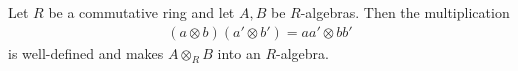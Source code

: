 \documentclass{memoir}
\begin{document}
\begin{prop}
	Let \(R\) be a commutative ring and let \(A,B\) be \(R\)-algebras. Then the multiplication
	\begin{align*}
		(a \otimes b) (a' \otimes b') = a a' \otimes b b'
	\end{align*} is well-defined and makes \(A\otimes_R B\) into an \(R\)-algebra.
\end{prop}

\begin{exmp}
	
\end{exmp}

\end{document}
